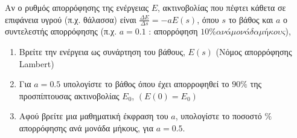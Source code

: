 



\pagestyle{askhseis}





\begin{center}
\end{center}

\vspace{\baselineskip}

\begin{mybox2}
\begin{exercise}
  Αν ο ρυθμός απορρόφησης της ενέργειας $E$, ακτινοβολίας που πέφτει κάθετα σε 
  επιφάνεια υγρού (π.χ. θάλασσα) είναι $ \frac{\Delta E}{\Delta s} = -a E(s) $, 
  όπου $s$ το βάθος και $a$ ο συντελεστής απορρόφησης (π.χ. $ a=0.1 $ : απορρόφηση 
  $ 10\% ανά μονάδα μήκους $), 
  \begin{enumerate}
    \item Βρείτε την ενέργεια ως συνάρτηση του βάθους, $ E(s) $ (Νόμος απορρόφησης
      Lambert)
    \item Για $ a=0.5 $ υπολογίστε το βάθος όπου έχει απορροφηθεί το $ 90\% $ της 
      προσπίπτουσας ακτινοβολίας $ E_{0} $, $(E(0)=E_{0}) $
    \item Αφού βρείτε μια μαθηματική έκφραση του $a$, υπολογίστε το ποσοστό $ \% $
      απορρόφησης ανά μονάδα μήκους, για $ a=0.5 $.
  \end{enumerate}
\end{exercise}
\end{mybox2}
